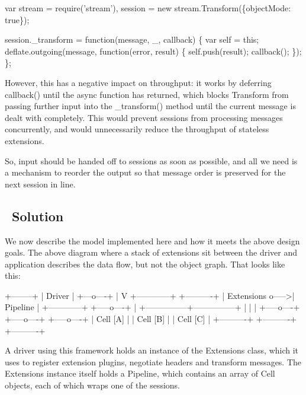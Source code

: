 \begin{DoxyCode}
var stream  = require('stream'),
    session = new stream.Transform(\{objectMode: true\});

session.\_transform = function(message, \_, callback) \{
  var self = this;
  deflate.outgoing(message, function(error, result) \{
    self.push(result);
    callback();
  \});
\};
\end{DoxyCode}


However, this has a negative impact on throughput\+: it works by deferring {\ttfamily callback()} until the async function has \textquotesingle{}returned\textquotesingle{}, which blocks {\ttfamily Transform} from passing further input into the {\ttfamily \+\_\+transform()} method until the current message is dealt with completely. This would prevent sessions from processing messages concurrently, and would unnecessarily reduce the throughput of stateless extensions.

So, input should be handed off to sessions as soon as possible, and all we need is a mechanism to reorder the output so that message order is preserved for the next session in line.

\subsection*{ \+Solution}

We now describe the model implemented here and how it meets the above design goals. The above diagram where a stack of extensions sit between the driver and application describes the data flow, but not the object graph. That looks like this\+:

\begin{DoxyVerb}        +--------+
        | Driver |
        +---o----+
            |
            V
      +------------+      +----------+
      | Extensions o----->| Pipeline |
      +------------+      +-----o----+
                                |
                +---------------+---------------+
                |               |               |
          +-----o----+    +-----o----+    +-----o----+
          | Cell [A] |    | Cell [B] |    | Cell [C] |
          +----------+    +----------+    +----------+
\end{DoxyVerb}


A driver using this framework holds an instance of the {\ttfamily Extensions} class, which it uses to register extension plugins, negotiate headers and transform messages. The {\ttfamily Extensions} instance itself holds a {\ttfamily Pipeline}, which contains an array of {\ttfamily Cell} objects, each of which wraps one of the sessions.

